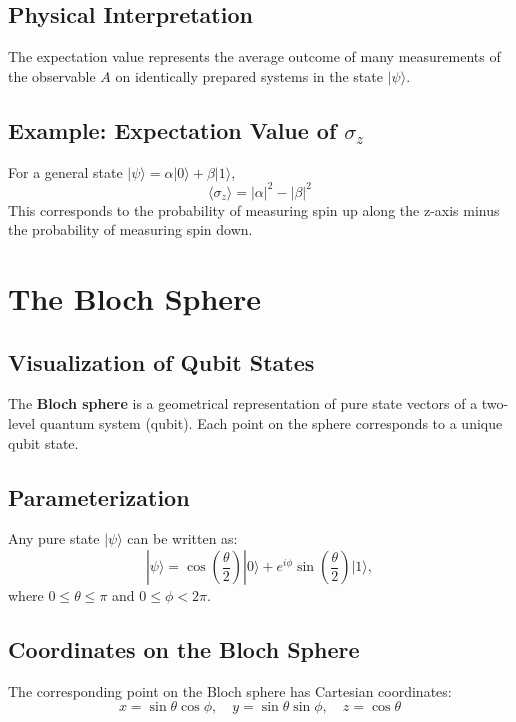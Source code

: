 \documentclass[12pt]{article}
\begin{document}
\subsection{Physical Interpretation}

The expectation value represents the average outcome of many measurements of the observable \( A \) on identically prepared systems in the state \( |\psi\rangle \).

\subsection{Example: Expectation Value of \( \sigma_z \)}

For a general state \( |\psi\rangle = \alpha |0\rangle + \beta |1\rangle \),
\[
\langle \sigma_z \rangle = |\alpha|^2 - |\beta|^2
\]
This corresponds to the probability of measuring spin up along the z-axis minus the probability of measuring spin down.

\section{The Bloch Sphere}

\subsection{Visualization of Qubit States}

The \textbf{Bloch sphere} is a geometrical representation of pure state vectors of a two-level quantum system (qubit). Each point on the sphere corresponds to a unique qubit state.

\subsection{Parameterization}

Any pure state \( |\psi\rangle \) can be written as:
\[
|\psi\rangle = \cos\left(\frac{\theta}{2}\right) |0\rangle + e^{i\phi} \sin\left(\frac{\theta}{2}\right) |1\rangle,
\]
where \( 0 \leq \theta \leq \pi \) and \( 0 \leq \phi < 2\pi \).

\subsection{Coordinates on the Bloch Sphere}

The corresponding point on the Bloch sphere has Cartesian coordinates:
\[
x = \sin\theta \cos\phi, \quad y = \sin\theta \sin\phi, \quad z = \cos\theta
\]
\end{document}
